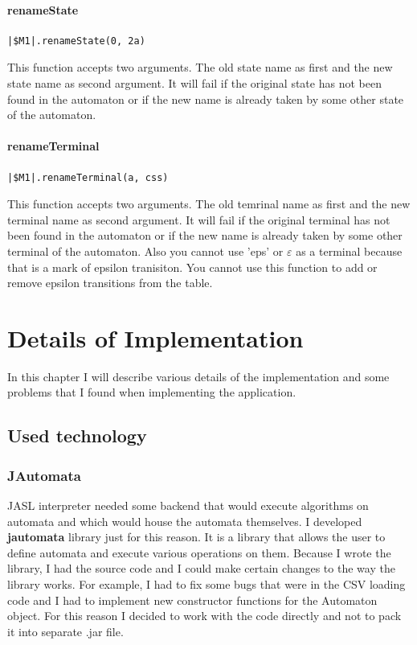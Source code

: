 \documentclass{ctuthesis}
\begin{document}
\subsubsection{renameState}
\begin{lstlisting}[language = JASL_snippet]
	|$M1|.renameState(0, 2a)
\end{lstlisting}

This function accepts two arguments. The old state name as first and the new state name as second argument. It will fail if the original state has not been found in the automaton or if the new name is already taken by some other state of the automaton.


\subsubsection{renameTerminal}
 \begin{lstlisting}[language = JASL_snippet]
	|$M1|.renameTerminal(a, css)
\end{lstlisting}

This function accepts two arguments. The old temrinal name as first and the new terminal name as second argument. It will fail if the original terminal has not been found in the automaton or if the new name is already taken by some other terminal of the automaton. Also you cannot use 'eps' or $\varepsilon$ as a terminal because that is a mark of epsilon tranisiton. You cannot use this function to add or remove epsilon transitions from the table.

\chapter{Details of Implementation}
In this chapter I will describe various details of the implementation and some problems that I found when implementing the application.

\section{Used technology}
\subsection{JAutomata}
JASL interpreter needed some backend that would execute algorithms on automata and which would house the automata themselves. I developed \textbf{jautomata} library just for this reason. It is a library that allows the user to define automata and execute various operations on them. Because I wrote the library, I had the source code and I could make certain changes to the way the library works. For example, I had to fix some bugs that were in the CSV loading code and I had to implement new constructor functions for the Automaton object. For this reason I decided to work with the code directly and not to pack it into separate .jar file. 
\end{document}
